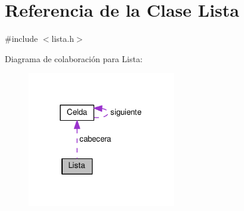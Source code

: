 \hypertarget{class_lista}{}\section{Referencia de la Clase Lista}
\label{class_lista}


{\ttfamily \#include $<$lista.\+h$>$}



Diagrama de colaboración para Lista\+:
\nopagebreak
\begin{figure}[H]
\begin{center}
\leavevmode
\includegraphics[width=183pt]{class_lista__coll__graph}
\end{center}
\end{figure}

